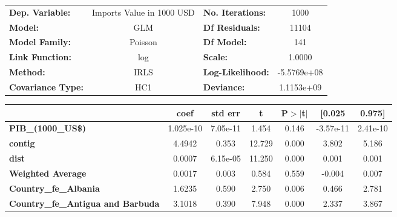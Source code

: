 \begin{center}
\begin{tabular}{lclc}
\toprule
\textbf{Dep. Variable:}                              & Imports Value in 1000 USD & \textbf{  No. Iterations:    } &     1000     \\
\textbf{Model:}                                      &            GLM            & \textbf{  Df Residuals:      } &    11104     \\
\textbf{Model Family:}                               &          Poisson          & \textbf{  Df Model:          } &     141      \\
\textbf{Link Function:}                              &            log            & \textbf{  Scale:             } &     1.0000   \\
\textbf{Method:}                                     &            IRLS           & \textbf{  Log-Likelihood:    } & -5.5769e+08  \\
\textbf{Covariance Type:}                            &            HC1            & \textbf{  Deviance:          } &  1.1153e+09  \\
\bottomrule
\end{tabular}
\begin{tabular}{lcccccc}
                                                     & \textbf{coef} & \textbf{std err} & \textbf{t} & \textbf{P$> |$t$|$} & \textbf{[0.025} & \textbf{0.975]}  \\
\midrule
\textbf{PIB\_(1000\_US\$)}                           &    1.025e-10  &     7.05e-11     &     1.454  &         0.146        &    -3.57e-11    &     2.41e-10     \\
\textbf{contig}                                      &       4.4942  &        0.353     &    12.729  &         0.000        &        3.802    &        5.186     \\
\textbf{dist}                                        &       0.0007  &     6.15e-05     &    11.250  &         0.000        &        0.001    &        0.001     \\
\textbf{Weighted Average}                            &       0.0017  &        0.003     &     0.584  &         0.559        &       -0.004    &        0.007     \\
\textbf{Country\_fe\_Albania}                        &       1.6235  &        0.590     &     2.750  &         0.006        &        0.466    &        2.781     \\
\textbf{Country\_fe\_Antigua and Barbuda}            &       3.1018  &        0.390     &     7.948  &         0.000        &        2.337    &        3.867     \\

\end{tabular}
\end{center}
